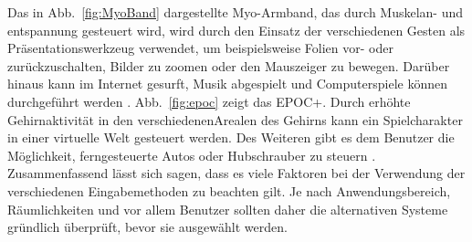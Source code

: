 \newline \newline
Das in Abb.~\ref{fig:MyoBand} dargestellte Myo-Armband, das durch Muskelan- und entspannung gesteuert wird, wird durch den Einsatz der verschiedenen Gesten als Präsentationswerkzeug verwendet, um beispielsweise Folien vor- oder zurückzuschalten, Bilder zu zoomen oder den Mauszeiger zu bewegen. Darüber hinaus kann im Internet gesurft, Musik abgespielt und Computerspiele können durchgeführt werden \cite{myoBand}.
\newline \newline
Abb.~\ref{fig:epoc} zeigt das EPOC+. Durch erhöhte Gehirnaktivität in den verschiedenen\linebreak Arealen des Gehirns kann ein Spielcharakter in einer virtuelle Welt gesteuert werden. Des Weiteren gibt es dem Benutzer die Möglichkeit, ferngesteuerte Autos oder Hubschrauber zu steuern \cite{epoc}.
\newline \newline \newline
Zusammenfassend lässt sich sagen, dass es viele Faktoren bei der Verwendung der verschiedenen Eingabemethoden zu beachten gilt. Je nach Anwendungsbereich, Räumlichkeiten und vor allem Benutzer sollten daher die alternativen Systeme gründlich überprüft, bevor sie ausgewählt werden.

